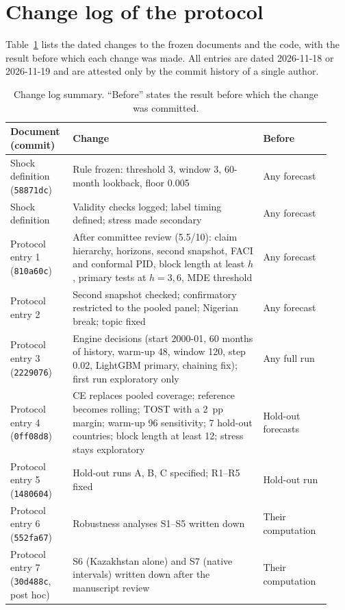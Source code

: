 \section{Change log of the protocol}\label{app:changes}

Table~\ref{tab:changelog} lists the dated changes to the frozen documents and the code, with the result before which each change was made. All entries are dated 2026-11-18 or 2026-11-19 and are attested only by the commit history of a single author.

\begin{table}[H]
\centering
\caption{Change log summary. ``Before'' states the result before which the change was committed.}
\label{tab:changelog}
\small
\begin{tabular}{@{}p{0.17\linewidth}p{0.56\linewidth}p{0.20\linewidth}@{}}
\toprule
Document (commit) & Change & Before \\
\midrule
Shock definition (\texttt{58871dc}) & Rule frozen: threshold 3, window 3, 60-month lookback, floor 0.005 & Any forecast \\
Shock definition & Validity checks logged; label timing defined; stress made secondary & Any forecast \\
Protocol entry 1 (\texttt{810a60c}) & After committee review (5.5/10): claim hierarchy, horizons, second snapshot, FACI and conformal PID, block length at least $h$, primary tests at $h=3,6$, MDE threshold & Any forecast \\
Protocol entry 2 & Second snapshot checked; confirmatory restricted to the pooled panel; Nigerian break; topic fixed & Any forecast \\
Protocol entry 3 (\texttt{2229076}) & Engine decisions (start 2000-01, 60 months of history, warm-up 48, window 120, step 0.02, LightGBM primary, chaining fix); first run exploratory only & Any full run \\
Protocol entry 4 (\texttt{0ff08d8}) & CE replaces pooled coverage; reference becomes rolling; TOST with a 2~pp margin; warm-up 96 sensitivity; 7 hold-out countries; block length at least 12; stress stays exploratory & Hold-out forecasts \\
Protocol entry 5 (\texttt{1480604}) & Hold-out runs A, B, C specified; R1--R5 fixed & Hold-out run \\
Protocol entry 6 (\texttt{552fa67}) & Robustness analyses S1--S5 written down & Their computation \\
Protocol entry 7 (\texttt{30d488c}, post hoc) & S6 (Kazakhstan alone) and S7 (native intervals) written down after the manuscript review & Their computation \\

\end{tabular}
\end{table}
